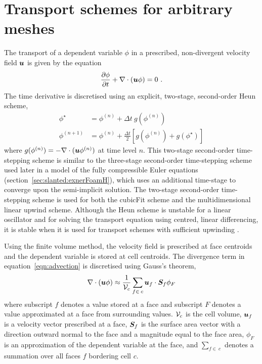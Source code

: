 \section{Transport schemes for arbitrary meshes}
\label{sec:cubicFit:transport}

The transport of a dependent variable $\phi$ in a prescribed, non-divergent velocity field $\bm{u}$ is given by the equation		
\begin{align}		
	\frac{\partial \phi}{\partial t} + \nabla \cdot \left( \bm{u} \phi \right) = 0 \text{ .} \label{eqn:advection}		
\end{align}
The time derivative is discretised using an explicit, two-stage, second-order Heun scheme,
\begin{subequations}
\begin{align}
	\phi^\star &= \phi^{(n)} + \Delta t \: g(\phi^{(n)}) \\
	\phi^{(n+1)} &= \phi^{(n)} + \frac{\Delta t}{2} \left[ g(\phi^{(n)}) + g(\phi^{\star}) \right]
\end{align} \label{eqn:heun}%
\end{subequations}
\unskip where \(g(\phi^{(n)}) = - \nabla \cdot (\bm{u} \phi^{(n)})\) at time level \(n\).
This two-stage second-order time-stepping scheme is similar to the three-stage second-order time-stepping scheme used later in a model of the fully compressible Euler equations (section~\ref{sec:slanted:exnerFoamH}), which uses an additional time-stage to converge upon the semi-implicit solution.
The two-stage second-order time-stepping scheme is used for both the cubicFit scheme and the multidimensional linear upwind scheme.
Although the Heun scheme is unstable for a linear oscillator \citep{durran2013} and for solving the transport equation using centred, linear differencing, it is stable when it is used for transport schemes with sufficient upwinding \citep[p. 149]{hundsdorfer-verwer2013}.

Using the finite volume method, the velocity field is prescribed at face centroids and the dependent variable is stored at cell centroids.  The divergence term in equation~\eqref{eqn:advection} is discretised using Gauss's theorem,
\begin{align}
	\nabla \cdot \left( \bm{u} \phi \right) \approx \frac{1}{\mathcal{V}_c} \sum_{f \in\:c} \bm{u}_f \cdot \bm{S}_f \phi_F \label{eqn:gauss-div}
\end{align}
where subscript $f$ denotes a value stored at a face and subscript $F$ denotes a value approximated at a face from surrounding values.  $\mathcal{V}_c$ is the cell volume, $\bm{u}_f$ is a velocity vector prescribed at a face, $\bm{S}_f$ is the surface area vector with a direction outward normal to the face and a magnitude equal to the face area, $\phi_F$ is an approximation of the dependent variable at the face, and $\sum_{f \in\:c}$ denotes a summation over all faces $f$ bordering cell $c$.

